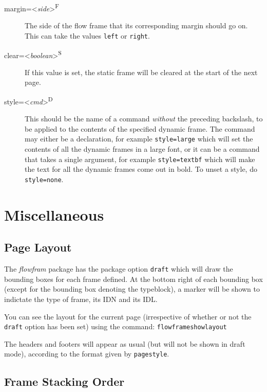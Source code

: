 \documentclass[a4paper]{report}
\newcommand{\cmdname}[1]{\texttt{\symbol{92}#1}}
\newcommand{\meta}[1]{\textnormal{\textless\textit{#1}\textgreater}}
\begin{document}
\begin{description}
\item[margin=\meta{side}\textsuperscript{F}]\mbox{}\par The side of
the flow frame that its corresponding margin should go on. This
can take the values \texttt{left} or \texttt{right}.

\item[clear=\meta{boolean}\textsuperscript{S}] If this value
is set, the static frame will be cleared at the start of the
next page.

\item[style=\meta{cmd}\textsuperscript{D}]\mbox{}\par This should be
the name of a command \emph{without} the preceding backslash, 
to be applied to the contents of the specified dynamic frame. 
The command may either be a declaration, for example \verb/style=large/
which will set the contents of all the dynamic frames in a
large font, or it can be a command that takes a single argument,
for example \verb/style=textbf/
which will make the text for all the dynamic frames come out in 
bold.  To unset a style, do \verb/style=none/.

\end{description}

\chapter{Miscellaneous}

\section*{Page Layout}

The \textsl{flowfram} package has the package option \texttt{draft}
which will draw the {bounding boxes} for
each frame defined.  At the bottom right of each
bounding box (except for the bounding box denoting the 
typeblock), a marker will be shown to indictate the type
of frame, its IDN and its IDL.

You can see the layout for the current page (irrespective of
whether or not the \texttt{draft} option has been set) using
the command:\newline 
\cmdname{flowframeshowlayout}

The headers and footers will appear as usual (but will not
be shown in draft mode), according to the format given by 
\cmdname{pagestyle}.

\section*{Frame Stacking Order}
\end{document}
